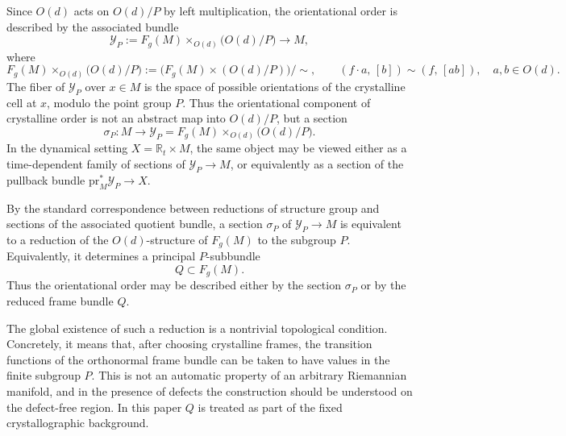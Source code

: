 \documentclass[11pt]{amsart}
\theoremstyle{plain}
\theoremstyle{definition}
\theoremstyle{remark}
\begin{document}
Since \(O(d)\) acts on \(O(d)/P\) by left multiplication, the orientational order is described by the associated bundle
\begin{equation}
	\mathcal Y_P
	:=
	F_g(M)\times_{O(d)}\bigl(O(d)/P\bigr)
	\longrightarrow M,
	\label{eq:YP_bundle}
\end{equation}
where
\begin{equation}
	F_g(M)\times_{O(d)}\bigl(O(d)/P\bigr)
	:=
	\bigl(F_g(M)\times (O(d)/P)\bigr)\big/\sim,
	\qquad
	(f\cdot a,\,[b])\sim (f,\,[ab]),
	\quad a,b\in O(d).
	\label{eq:associated_equiv_relation}
\end{equation}
The fiber of \(\mathcal Y_P\) over \(x\in M\) is the space of possible orientations of the crystalline cell at \(x\), modulo the point group \(P\). 
Thus the orientational component of crystalline order is not an abstract map into \(O(d)/P\), but a section
\begin{equation}
	\sigma_P:M\longrightarrow \mathcal Y_P
	=
	F_g(M)\times_{O(d)}\bigl(O(d)/P\bigr).
	\label{eq:sigmaP}
\end{equation}
In the dynamical setting \(X=\mathbb R_t\times M\), the same object may be viewed either as a time-dependent family of sections of \(\mathcal Y_P\to M\), or equivalently as a section of the pullback bundle \(\mathrm{pr}_M^*\mathcal Y_P\to X\).

By the standard correspondence between reductions of structure group and sections of the associated quotient bundle, a section \(\sigma_P\) of \(\mathcal Y_P\to M\) is equivalent to a reduction of the \(O(d)\)-structure of \(F_g(M)\) to the subgroup \(P\). 
Equivalently, it determines a principal \(P\)-subbundle
\begin{equation}
	Q\subset F_g(M).
	\label{eq:Q_in_frame_bundle}
\end{equation}
Thus the orientational order may be described either by the section \(\sigma_P\) or by the reduced frame bundle \(Q\).

The global existence of such a reduction is a nontrivial topological condition. 
Concretely, it means that, after choosing crystalline frames, the transition functions of the orthonormal frame bundle can be taken to have values in the finite subgroup \(P\). 
This is not an automatic property of an arbitrary Riemannian manifold, and in the presence of defects the construction should be understood on the defect-free region. 
In this paper \(Q\) is treated as part of the fixed crystallographic background.

\medskip
\end{document}
